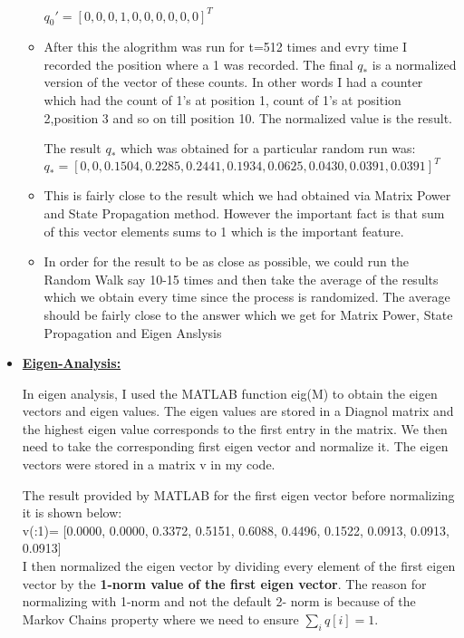 \documentclass[11pt]{article}
\begin{document}
\begin{itemize}
\begin{itemize}
	$q_0' =[0, 0, 0, 1, 0, 0, 0, 0, 0, 0]^T$
	
	\item After this the alogrithm was run for t=512 times and evry time I recorded the position where a 1 was recorded. The final $q_*$ is a normalized version of the vector of these counts. In other words I had a counter which had the count of 1's at position 1, count of 1's at position 2,position 3 and so on till position 10. The normalized value is the result. 
	
	The result $q_*$ which was obtained for a particular random run was:\\
	$\boxed{q_*= [0, 0,    0.1504,    0.2285,    0.2441,    0.1934,    0.0625,    0.0430,    0.0391,    0.0391 ]^T}$
	
	\item This is fairly close to the result which we had obtained via Matrix Power and State Propagation method. However the important fact is that sum of this vector elements sums to 1 which is the important feature.
	
	\item In order for the result to be as close as possible, we could run the Random Walk say 10-15 times and then take the average of the results which we obtain every time since the process is randomized. The average should be fairly close to the answer which we get for Matrix Power, State Propagation and Eigen Anslysis
	\end{itemize}
	
	\newpage
	
	\item[] \textbf{\underline{Eigen-Analysis:}}
	
	In eigen analysis, I used the MATLAB function eig(M) to obtain the eigen vectors and eigen values. The eigen values are stored in a Diagnol matrix and the highest eigen value corresponds to the first entry in the matrix. We then need to take the corresponding first eigen vector and normalize it. The eigen vectors were stored in a matrix v in my code.
	
	The result provided by MATLAB for the first eigen vector before normalizing it is shown below:\\
	v(:1)=
	[0.0000,
	0.0000,
	0.3372,
	0.5151,
	0.6088,
	0.4496,
	0.1522,
	0.0913,
	0.0913,
	0.0913] \\
	
	I then normalized the eigen vector by dividing every element of the first eigen vector by the \textbf{ 1-norm value of the first eigen vector}. The reason for normalizing with 1-norm and not the default 2- norm is because of the Markov Chains property where we need to ensure $\boxed{\sum_{i} q[i] =1}$. \\
	

\end{itemize}
\end{document}
